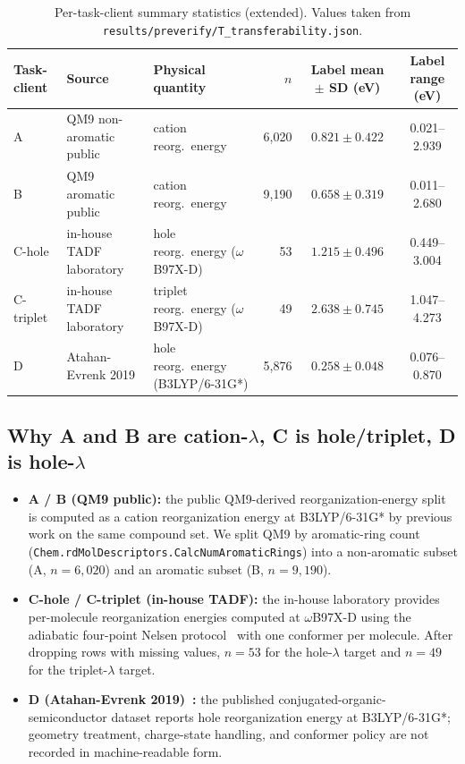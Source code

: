 \documentclass[11pt,a4paper]{article}
\begin{document}
\begin{table}[h]
\centering
\footnotesize
\caption{Per-task-client summary statistics (extended). Values taken from \texttt{results/preverify/T\_transferability.json}.}\label{tab:si:nodes}
\begin{tabularx}{\textwidth}{@{}l X X r c c@{}}
\toprule
Task-client & Source & Physical quantity & $n$ & Label mean $\pm$ SD (eV) & Label range (eV) \\
\midrule
A         & QM9 non-aromatic public  & cation reorg.\ energy             & 6{,}020 & $0.821 \pm 0.422$ & 0.021--2.939 \\
B         & QM9 aromatic public      & cation reorg.\ energy             & 9{,}190 & $0.658 \pm 0.319$ & 0.011--2.680 \\
C-hole    & in-house TADF laboratory & hole reorg.\ energy ($\omega$B97X-D)    & 53      & $1.215 \pm 0.496$ & 0.449--3.004 \\
C-triplet & in-house TADF laboratory & triplet reorg.\ energy ($\omega$B97X-D) & 49      & $2.638 \pm 0.745$ & 1.047--4.273 \\
D         & Atahan-Evrenk 2019       & hole reorg.\ energy (B3LYP/6-31G*) & 5{,}876 & $0.258 \pm 0.048$ & 0.076--0.870 \\
\bottomrule
\end{tabularx}
\end{table}

\subsection{Why A and B are cation-$\lambda$, C is hole/triplet, D is hole-$\lambda$}
\begin{itemize}
  \item \textbf{A / B (QM9 public):} the public QM9-derived reorganization-energy split is computed as a cation reorganization energy at B3LYP/6-31G* by previous work on the same compound set. We split QM9 by aromatic-ring count (\verb|Chem.rdMolDescriptors.CalcNumAromaticRings|) into a non-aromatic subset (A, $n = 6{,}020$) and an aromatic subset (B, $n = 9{,}190$).
  \item \textbf{C-hole / C-triplet (in-house TADF):} the in-house laboratory provides per-molecule reorganization energies computed at $\omega$B97X-D using the adiabatic four-point Nelsen protocol~\citep{Nelsen1987} with one conformer per molecule. After dropping rows with missing values, $n = 53$ for the hole-$\lambda$ target and $n = 49$ for the triplet-$\lambda$ target.
  \item \textbf{D (Atahan-Evrenk 2019)~\citep{AtahanEvrenk2019_RE}:} the published conjugated-organic-semiconductor dataset reports hole reorganization energy at B3LYP/6-31G*; geometry treatment, charge-state handling, and conformer policy are not recorded in machine-readable form.
\end{itemize}
\end{document}

